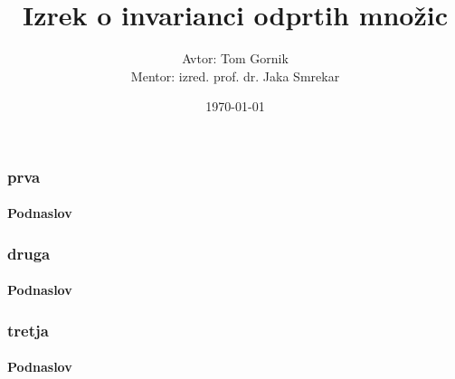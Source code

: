 \documentclass{beamer}
\title{Izrek o invarianci odprtih množic}
\author[Tom Gornik]{Avtor: Tom Gornik\\ \footnotesize Mentor: izred. prof. dr. Jaka Smrekar}
\institute{Fakulteta za matematiko in fiziko}
\date{\today}
\begin{document}

\frame{\titlepage}

\begin{frame}

\frametitle{prva}
\framesubtitle{Podnaslov}

\end{frame}

\begin{frame}

\frametitle{druga}
\framesubtitle{Podnaslov}

\end{frame}

\begin{frame}

\frametitle{tretja}
\framesubtitle{Podnaslov}

\end{frame}
\end{document}
